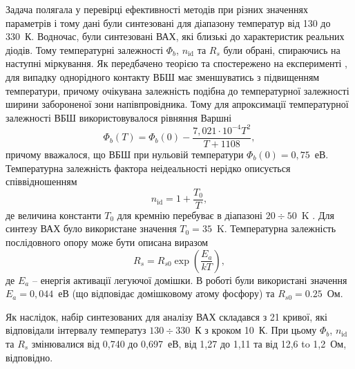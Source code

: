 Задача полягала у перевірці ефективності методів при різних значеннях параметрів і тому дані були синтезовані для діапазону температур від 130 до 330~К.
Водночас, були синтезовані ВАХ, які близькі до характеристик реальних діодів.
Тому температурні залежності $\Phi_b$, $n_\mathrm{id}$ та $R_s$ були обрані, спираючись на наступні міркування.
Як передбачено теорією \cite{Rhoderick1988} та спостережено на експерименті \cite{Aboelfotoh,Zhua},
для випадку однорідного контакту  ВБШ має зменшуватись з підвищенням температури, причому очікувана залежність подібна до температурної залежності ширини забороненої зони напівпровідника.
Тому для апроксимації температурної залежності ВБШ використовувалося рівняння Варшні \cite{SiEg2012}
\begin{equation}
\label{eqFbT}
\Phi_b(T) = \Phi_b(0) - \frac{7,021\cdot10^{-4} T^2}{T + 1108} ,
\end{equation}
причому вважалося, що ВБШ при нульовій температури $\Phi_b(0)=0,75$~еВ.
Температурна залежність фактора неідеальності нерідко описується співвідношенням
\begin{equation}
\label{eqnT}
n_\mathrm{id}=1+\frac{T_0}{T},
\end{equation}
де величина константи $T_0$ для кремнію перебуває в діапазоні $20\div50$~K \cite{T0:Lee,T0:McCafferty,T0:Saxena,Aboelfotoh}.
Для синтезу ВАХ було використане значення $T_0=35$~K.
Температурна залежність послідовного опору може бути описана виразом \cite{Sze2012,Rs:Meyaard,Rs:Kang}
\begin{equation}
\label{eqRsT}
R_s=R_{s0}\exp\left(\frac{E_a}{kT}\right),
\end{equation}
де $E_a$ -- енергія активації легуючої домішки.
В роботі були використані значення $E_a=0,044$~еВ (що відповідає домішковому атому фосфору) та $R_{s0}=0.25$~Ом.

Як наслідок, набір синтезованих для аналізу ВАХ складався з 21 кривої, які відповідали інтервалу температуз $130\div330$~К з кроком 10~К.
При цьому  $\Phi_b$, $n_\mathrm{id}$ та $R_s$ змінювалися від 0,740 до 0,697~еВ, від 1,27 до 1,11 та від 12,6 to 1,2~Ом, відповідно.


